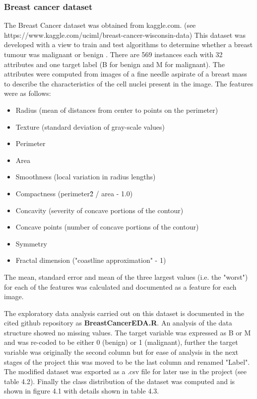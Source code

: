 \subsubsection{Breast cancer dataset}
The Breast Cancer dataset was obtained from kaggle.com. \newline
(see https://www.kaggle.com/uciml/breast-cancer-wisconsin-data) \newline
This dataset was developed with a view to train and test algorithms to determine whether a breast tumour was malignant or benign \citep{OLMangasarian:1994ue}. \newline
There are  569 instances each with 32 attributes and one target label (B for benign and M for malignant).\newline
The attributes were computed from images of a fine needle aspirate of a breast mass to describe the characteristics of the cell nuclei present in the image. The features were as follows:
\begin{itemize}
    \item Radius (mean of distances from center to points on the perimeter)
    \item Texture (standard deviation of gray-scale values) 
    \item Perimeter 
    \item Area 
    \item Smoothness (local variation in radius lengths) 
    \item Compactness (perimeter\^2 / area - 1.0)
    \item Concavity (severity of concave portions of the contour)
    \item Concave points (number of concave portions of the contour)
    \item Symmetry
    \item Fractal dimension ("coastline approximation" - 1)
\end{itemize}

The mean, standard error and mean of the three largest values (i.e. the "worst") for each of the features was calculated and documented as a feature for each image.\newline

The exploratory data analysis carried out on this dataset is documented in the cited github repository as \textbf{BreastCancerEDA.R}.\newline
An analysis of the data structure showed no missing values. The target variable was expressed as B or M and was re-coded to be either 0 (benign) or 1 (malignant), further the target variable was originally the second column but for ease of analysis in the next stages of the project this was moved to be the last column and renamed "Label".\newline
The modified dataset was exported as a .csv file for later use in the project (see table 4.2).\newline
Finally the class distribution of the dataset was computed and is shown in figure 4.1 with details shown in table 4.3.\newline 


